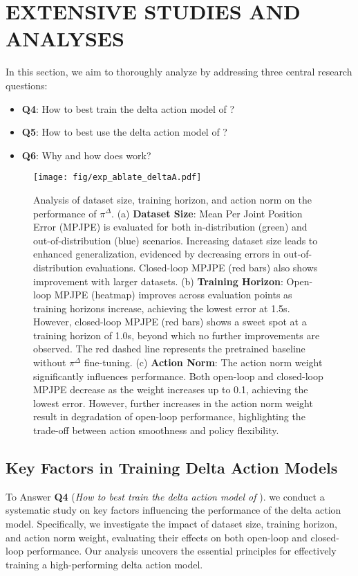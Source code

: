 \section{EXTENSIVE STUDIES AND ANALYSES}

In this section, we aim to thoroughly analyze \method by addressing three central research questions:
\begin{itemize}
    \item \textbf{Q4}: How to best train the delta action model of \method?
    \item \textbf{Q5}: How to best use the delta action model of \method?
    \item \textbf{Q6}: Why and how does \method work?
\end{itemize}

\begin{figure*}[t]
    \centering
    \texttt{[image: fig/exp\_ablate\_deltaA.pdf]}
     \vspace{-4mm}
    \caption{Analysis of dataset size, training horizon, and action norm on the performance of $\pi^\Delta$. (a) \textbf{Dataset Size}: Mean Per Joint Position Error (MPJPE) is evaluated for both in-distribution (green) and out-of-distribution (blue) scenarios. Increasing dataset size leads to enhanced generalization, evidenced by decreasing errors in out-of-distribution evaluations. Closed-loop MPJPE (red bars) also shows improvement with larger datasets. (b) \textbf{Training Horizon}: Open-loop MPJPE (heatmap) improves across evaluation points as training horizons increase, achieving the lowest error at 1.5s. However, closed-loop MPJPE (red bars) shows a sweet spot at a training horizon of 1.0s, beyond which no further improvements are observed. The red dashed line represents the pretrained baseline without $\pi^\Delta$ fine-tuning. (c) \textbf{Action Norm}: The action norm weight significantly influences performance. Both open-loop and closed-loop MPJPE decrease as the weight increases up to 0.1, achieving the lowest error. However, further increases in the action norm weight result in degradation of open-loop performance, highlighting the trade-off between action smoothness and policy flexibility.}
    \label{fig:deltaA_ablation}
\end{figure*}

\subsection{Key Factors in Training Delta Action Models}
\label{sec:VA}
To Answer \textbf{Q4} (\textit{How to best train the delta action model of \method}). 
we conduct a systematic study on key factors influencing the performance of the delta action model. 
Specifically, we investigate the impact of dataset size, training horizon, and action norm weight, evaluating their effects on both open-loop and closed-loop performance. Our analysis uncovers the essential principles for effectively training a high-performing delta action model.

